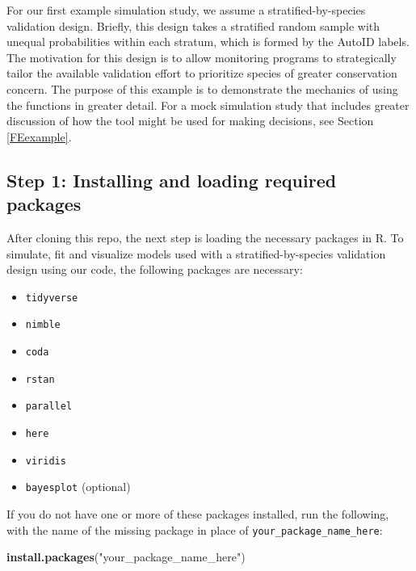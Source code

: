 \documentclass[
]{article}
\newenvironment{Shaded}{\begin{snugshade}}{\end{snugshade}}
\newcommand{\FunctionTok}[1]{\textcolor[rgb]{0.13,0.29,0.53}{\textbf{#1}}}
\newcommand{\NormalTok}[1]{#1}
\newcommand{\StringTok}[1]{\textcolor[rgb]{0.31,0.60,0.02}{#1}}
\providecommand{\tightlist}{%
  \setlength{\itemsep}{0pt}\setlength{\parskip}{0pt}}
\begin{document}
For our first example simulation study, we assume a stratified-by-species validation design. Briefly, this design takes a stratified random sample with unequal probabilities within each stratum, which is formed by the AutoID labels. The motivation for this design is to allow monitoring programs to strategically tailor the available validation effort to prioritize species of greater conservation concern. The purpose of this example is to demonstrate the mechanics of using the functions in greater detail. For a mock simulation study that includes greater discussion of how the tool might be used for making decisions, see Section \ref{FEexample}.

\hypertarget{step-1-installing-and-loading-required-packages}{%
\subsection{Step 1: Installing and loading required packages}\label{step-1-installing-and-loading-required-packages}}

After cloning this repo, the next step is loading the necessary packages in R. To simulate, fit and visualize models used with a stratified-by-species validation design using our code, the following packages are necessary:

\begin{itemize}
\tightlist
\item
  \texttt{tidyverse}
\item
  \texttt{nimble}
\item
  \texttt{coda}
\item
  \texttt{rstan}
\item
  \texttt{parallel}
\item
  \texttt{here}
\item
  \texttt{viridis}
\item
  \texttt{bayesplot} (optional)
\end{itemize}

If you do not have one or more of these packages installed, run the following, with the name of the missing package in place of \texttt{your\_package\_name\_here}:

\linespread{1}

\begin{Shaded}
\begin{Highlighting}[]
\FunctionTok{install.packages}\NormalTok{(}\StringTok{"your\_package\_name\_here"}\NormalTok{)}
\end{Highlighting}
\end{Shaded}
\end{document}
